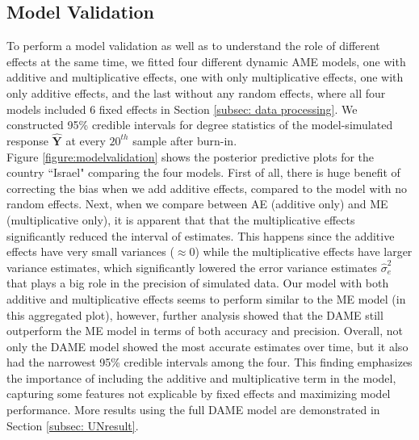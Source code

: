 \documentclass[a4paper]{article}
\begin{document}
\subsection{Model Validation}\label{subsec: Model Validation}
To perform a model validation as well as to understand the role of different effects at the same time, we fitted four different dynamic AME models, one with additive and multiplicative effects, one with only multiplicative effects, one with only additive effects, and the last without any random effects, where all four models included 6 fixed effects in Section \ref{subsec: data processing}. We constructed 95\% credible intervals for degree statistics of the model-simulated response $\hat{\mathbf{Y}}$ at every $20^{th}$ sample after burn-in. \\ \newline
Figure \ref{figure:modelvalidation} shows the posterior predictive plots for the country ``Israel" comparing the four models. First of all, there is huge benefit of correcting the bias when we add additive effects, compared to the model with no random effects. Next, when we compare between AE (additive only) and ME (multiplicative only), it is apparent that that the multiplicative effects significantly reduced the interval of estimates. This happens since the additive effects have very small variances ($\approx0$) while the multiplicative effects have larger variance estimates, which significantly lowered the error variance estimates $\hat\sigma_e^2$ that plays a big role in the precision of simulated data. Our model with both additive and multiplicative effects seems to perform similar to the ME model (in this aggregated plot), however, further analysis showed that the DAME still outperform the ME model in terms of both accuracy and precision. Overall, not only the DAME model showed the most accurate estimates over time, but it also had the narrowest 95\% credible intervals among the four. This finding emphasizes the importance of including the additive and multiplicative term in the model, capturing some features not explicable by fixed effects and maximizing model performance. More results using the full DAME model are demonstrated in Section \ref{subsec: UNresult}.
\end{document}
